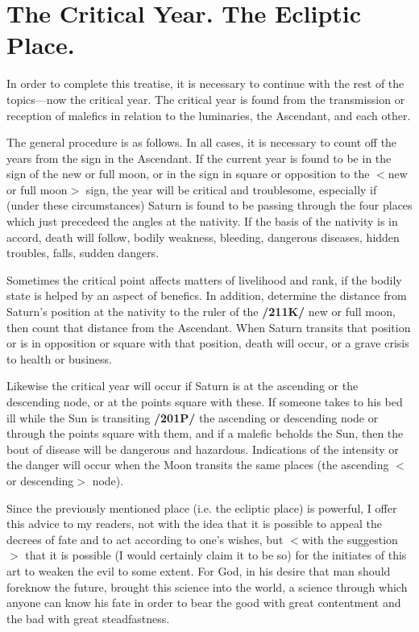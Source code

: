 \section{The Critical Year. The Ecliptic Place.}

In order to complete this treatise, it is necessary to continue with the rest of the topics—now the critical year. The critical year is found from the transmission or reception of malefics in relation to the luminaries, the Ascendant, and each other. 

The general procedure is as follows. In all cases, it is necessary
to count off the years from the sign in the Ascendant. If the current year is found to be in the sign of the new or full moon, or in the sign in square or opposition to the $<$new or full moon$>$ sign, the year will be critical and troublesome, especially if (under these circumstances) Saturn is found to be passing through the four places which just precedeed the angles at the nativity. If the basis of the nativity is in accord, death will follow, bodily weakness, bleeding, dangerous diseases, hidden troubles, falls, sudden dangers.

Sometimes the critical point affects matters of livelihood and rank, if the bodily state is helped by an aspect of benefics. In addition, determine the distance from Saturn’s position at the nativity to the ruler of the \textbf{/211K/} new or full moon, then count that distance from the Ascendant. When Saturn transits that position or is in opposition or square with that position, death will occur, or a grave crisis to health or business. 

Likewise the critical year will occur if Saturn is at the ascending or the descending node, or at the points square with these. If someone takes to his bed ill while the Sun is transiting \textbf{/201P/} the ascending or descending node or through the points square with them, and if a malefic beholds the Sun, then the bout of disease will be dangerous and hazardous. Indications of the intensity or the danger will occur when the Moon transits the same places (the ascending $<$or descending$>$ node).

\mndl Since the previously mentioned place (i.e. the ecliptic place) is powerful, I offer this advice to my readers, not with the idea that it is possible to appeal the decrees of fate and to act according to one’s wishes, but $<$with the suggestion$>$ that it is possible (I would certainly claim it to be so) for the initiates of this art to weaken the evil to some extent. For God, in his desire that man should foreknow the future, brought this science into the world, a science through which anyone can know his fate in order to bear the good with great contentment and the bad with great steadfastness. 

